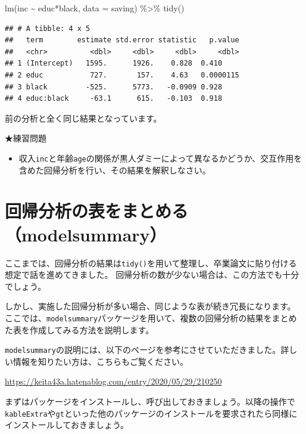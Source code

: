 \documentclass[
]{book}
\newenvironment{Shaded}{\begin{snugshade}}{\end{snugshade}}
\newcommand{\AttributeTok}[1]{\textcolor[rgb]{0.77,0.63,0.00}{#1}}
\newcommand{\FunctionTok}[1]{\textcolor[rgb]{0.00,0.00,0.00}{#1}}
\newcommand{\NormalTok}[1]{#1}
\newcommand{\SpecialCharTok}[1]{\textcolor[rgb]{0.00,0.00,0.00}{#1}}
\providecommand{\tightlist}{%
  \setlength{\itemsep}{0pt}\setlength{\parskip}{0pt}}
\begin{document}
\begin{Shaded}
\begin{Highlighting}[]
\FunctionTok{lm}\NormalTok{(inc }\SpecialCharTok{\textasciitilde{}}\NormalTok{ educ}\SpecialCharTok{*}\NormalTok{black, }\AttributeTok{data =}\NormalTok{ saving) }\SpecialCharTok{\%\textgreater{}\%}
  \FunctionTok{tidy}\NormalTok{()}
\end{Highlighting}
\end{Shaded}

\begin{verbatim}
## # A tibble: 4 x 5
##   term        estimate std.error statistic   p.value
##   <chr>          <dbl>     <dbl>     <dbl>     <dbl>
## 1 (Intercept)   1595.      1926.    0.828  0.410    
## 2 educ           727.       157.    4.63   0.0000115
## 3 black         -525.      5773.   -0.0909 0.928    
## 4 educ:black     -63.1      615.   -0.103  0.918
\end{verbatim}

前の分析と全く同じ結果となっています。

★練習問題

\begin{itemize}
\tightlist
\item
  収入\texttt{inc}と年齢\texttt{age}の関係が黒人ダミーによって異なるかどうか、交互作用を含めた回帰分析を行い、その結果を解釈しなさい。
\end{itemize}

\hypertarget{modelsummary}{%
\section{回帰分析の表をまとめる（modelsummary）}\label{modelsummary}}

ここまでは、回帰分析の結果は\texttt{tidy()}を用いて整理し、卒業論文に貼り付ける想定で話を進めてきました。
回帰分析の数が少ない場合は、この方法でも十分でしょう。

しかし、実施した回帰分析が多い場合、同じような表が続き冗長になります。
ここでは、\texttt{modelsummary}パッケージを用いて、複数の回帰分析の結果をまとめた表を作成してみる方法を説明します。

\texttt{modelsummary}の説明には、以下のページを参考にさせていただきました。詳しい情報を知りたい方は、こちらもご覧ください。

\url{https://keita43a.hatenablog.com/entry/2020/05/29/210250}

まずはパッケージをインストールし、呼び出しておきましょう。以降の操作で\texttt{kableExtra}や\texttt{gt}といった他のパッケージのインストールを要求されたら同様にインストールしておきましょう。
\end{document}
